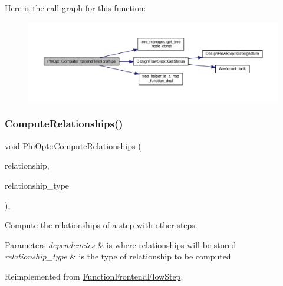 Here is the call graph for this function\+:
\nopagebreak
\begin{figure}[H]
\begin{center}
\leavevmode
\includegraphics[width=350pt]{dc/ddf/classPhiOpt_ab3c872c6509a082eb92c957a6afc1de1_cgraph}
\end{center}
\end{figure}
\mbox{\label{classPhiOpt_ae9fa634dbb3dfb91ff7928cc8e48be1c}} 
\subsubsection{\texorpdfstring{Compute\+Relationships()}{ComputeRelationships()}}
{\footnotesize\ttfamily void Phi\+Opt\+::\+Compute\+Relationships (\begin{DoxyParamCaption}\item[{\hyperlink{classDesignFlowStepSet}{Design\+Flow\+Step\+Set} \&}]{relationship,  }\item[{const \hyperlink{classDesignFlowStep_a723a3baf19ff2ceb77bc13e099d0b1b7}{Design\+Flow\+Step\+::\+Relationship\+Type}}]{relationship\+\_\+type }\end{DoxyParamCaption})\hspace{0.3cm}{\ttfamily [override]}, {\ttfamily [virtual]}}



Compute the relationships of a step with other steps. 


\begin{DoxyParams}{Parameters}
{\em dependencies} & is where relationships will be stored \\
\hline
{\em relationship\+\_\+type} & is the type of relationship to be computed \\
\hline
\end{DoxyParams}


Reimplemented from \hyperlink{classFunctionFrontendFlowStep_a1a815ea7885f3e92e414dadd40c43cba}{Function\+Frontend\+Flow\+Step}.



